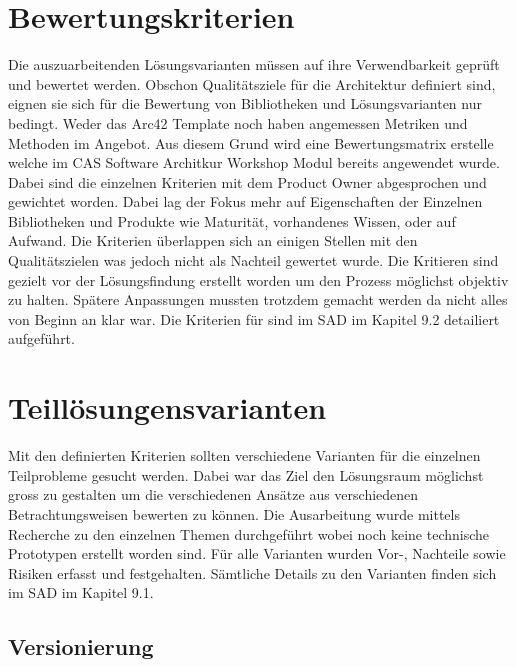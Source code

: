 \section{Bewertungskriterien}

Die auszuarbeitenden Lösungsvarianten müssen auf ihre Verwendbarkeit geprüft und bewertet werden. Obschon Qualitätsziele für die Architektur definiert sind, eignen sie sich für die Bewertung von Bibliotheken und Lösungsvarianten nur bedingt. Weder das Arc42 Template noch \cite{esa} haben angemessen Metriken und Methoden im Angebot. Aus diesem Grund wird eine Bewertungsmatrix erstelle welche im CAS Software Architkur Workshop Modul bereits angewendet wurde. Dabei sind die einzelnen Kriterien mit dem Product Owner abgesprochen und gewichtet worden. Dabei lag der Fokus mehr auf Eigenschaften der Einzelnen Bibliotheken und Produkte wie Maturität, vorhandenes Wissen, oder auf Aufwand. Die Kriterien überlappen sich an einigen Stellen mit den Qualitätszielen was jedoch nicht als Nachteil gewertet wurde. Die Kritieren sind gezielt vor der Lösungsfindung erstellt worden um den Prozess möglichst objektiv zu halten. Spätere Anpassungen mussten trotzdem gemacht werden da nicht alles von Beginn an klar war. Die Kriterien für sind im SAD im Kapitel 9.2 detailiert aufgeführt.

\section{Teillösungensvarianten}

Mit den definierten Kriterien sollten verschiedene Varianten für die einzelnen Teilprobleme gesucht werden. Dabei war das Ziel den Lösungsraum möglichst gross zu gestalten um die verschiedenen Ansätze aus verschiedenen Betrachtungsweisen bewerten zu können. Die Ausarbeitung wurde mittels Recherche zu den einzelnen Themen durchgeführt wobei noch keine technische Prototypen erstellt worden sind. Für alle Varianten wurden Vor-, Nachteile sowie Risiken erfasst und festgehalten. Sämtliche Details zu den Varianten finden sich im SAD im Kapitel 9.1.

\subsection{Versionierung}

